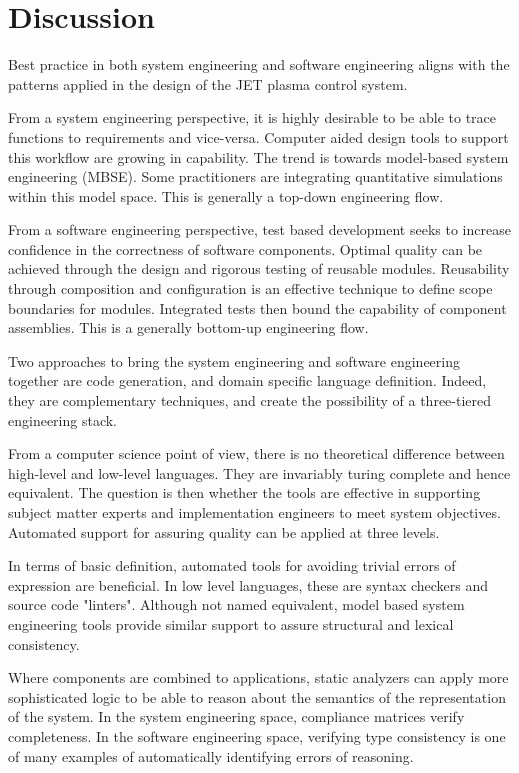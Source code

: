 \documentclass[5p]{elsarticle}
\begin{document}
\section{Discussion}

Best practice in both system engineering and software engineering 
aligns with the patterns applied in the design of the JET plasma control system.

From a system engineering perspective, it is highly desirable to be
able to trace functions to requirements and vice-versa. Computer
aided design tools to support this workflow are growing in capability.
The trend is towards model-based system engineering (MBSE).  Some
practitioners are integrating quantitative simulations within this
model space. This is generally a top-down engineering flow.

From a software engineering perspective, test based development seeks
to increase confidence in the correctness of software components.
Optimal quality can be achieved through the design and rigorous testing
of reusable modules.  Reusability through composition and configuration
is an effective technique to define scope boundaries for modules.
Integrated tests then bound the capability of component assemblies.
This is a generally bottom-up engineering flow.

Two approaches to bring the system engineering and software engineering
together are code generation, and domain specific language definition.
Indeed, they are complementary techniques, and create the possibility
of a three-tiered engineering stack.

From a computer science point of view, there is no theoretical difference
between high-level and low-level languages.  They are invariably
turing complete and hence equivalent. The question is then whether the
tools are effective in supporting subject matter experts and 
implementation engineers to meet system objectives.
Automated support for assuring quality can be applied at three
levels.

In terms of basic definition, automated tools for avoiding trivial errors of expression
are beneficial.  In low level languages, these are syntax checkers
and source code "linters".  Although not named equivalent, model
based system engineering tools provide similar support to assure
structural and lexical consistency.

Where components are combined to applications,
static analyzers can apply more sophisticated logic to
be able to reason about the semantics of the representation
of the system.  In the system engineering space, compliance 
matrices verify completeness.  In the software engineering
space, verifying type consistency is one of many examples
of automatically identifying errors of reasoning.
\end{document}
